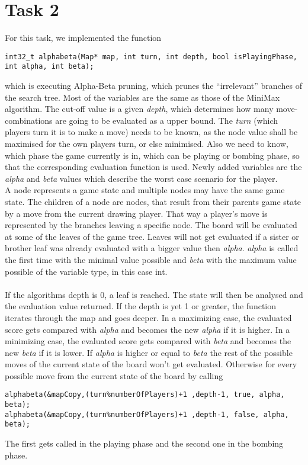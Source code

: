 \section{Task 2}

For this task, we implemented the function 
\begin{lstlisting}[frame=none, numbers=none]
int32_t alphabeta(Map* map, int turn, int depth, bool isPlayingPhase, int alpha, int beta);
\end{lstlisting}
which is executing Alpha-Beta pruning, which prunes the “irrelevant” branches of the search tree. 
Most of the variables are the same as those of the MiniMax algorithm. The cut-off value is a given \emph{depth}, which determines how many move-combinations are going to be evaluated as a upper bound. The \emph{turn} (which players turn it is to make a move) needs to be known, as the node value shall be maximised for the own players turn, or else minimised. Also we need to know, which phase the game currently is in, which can be playing or bombing phase, so that the corresponding evaluation function is used. Newly added variables are the \emph{alpha} and \emph{beta} values which describe the worst case scenario for the player. \\
A node represents a game state and multiple nodes may have the same game state. The children of a node are nodes, that result from their parents game state by a move from the current drawing player. That way a player's move is represented by the branches leaving a specific node. The board will be evaluated at some of the leaves of the game tree. Leaves will not get evaluated if a sister or brother leaf was already evaluated with a bigger value then \emph{alpha}. \emph{alpha} is called the first time with the minimal value possible and \emph{beta} with the maximum value possible of the variable type, in this case int.
\\\\
If the algorithms depth is 0, a leaf is reached. The state will then be analysed and the evaluation value returned. If the depth is yet 1 or greater, the function iterates through the map and goes deeper. In a maximizing case, the evaluated score gets compared with \emph{alpha} and becomes the new \emph{alpha} if it is higher. In a minimizing case, the evaluated score gets compared with \emph{beta} and becomes the new \emph{beta} if it is lower. If \emph{alpha} is higher or equal to \emph{beta} the rest of the possible moves of the current state of the board won't get evaluated. Otherwise for every possible move from the current state of the board by calling 
\begin{lstlisting}[frame=none, numbers=none]
alphabeta(&mapCopy,(turn%numberOfPlayers)+1 ,depth-1, true, alpha, beta);
alphabeta(&mapCopy,(turn%numberOfPlayers)+1 ,depth-1, false, alpha, beta);
\end{lstlisting}
The first gets called in the playing phase and the second one in the bombing phase. \\